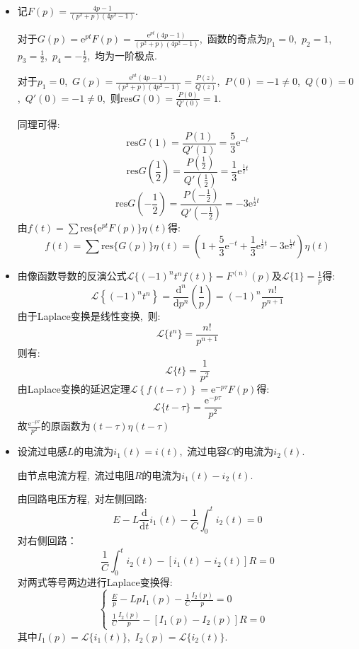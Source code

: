 \documentclass[a4paper,fontset=windows]{ctexart}
\begin{document}
\begin{itemize}
\smallskip
\item[4.(3)]
记$F(p)=\frac{4p-1}{(p^2+p)(4p^2-1)}$.

对于$G(p)=\mathrm{e}^{pt}F(p)=\frac{\mathrm{e}^{pt}(4p-1)}{(p^2+p)(4p^2-1)}$,\ 函数的奇点为$p_1=0$,\ $p_2=1$,\ $p_3=\frac{1}{2}$,\ $p_4=-\frac{1}{2}$,\ 均为一阶极点.

对于$p_1=0$,\ $G(p)=\frac{\mathrm{e}^{pt}(4p-1)}{(p^2+p)(4p^2-1)}=\frac{P(z)}{Q(z)}$,\ $P(0)=-1\neq0$,\ $Q(0)=0$,\ $Q'(0)=-1\neq0$,\ 则$\mathrm{res}G(0)=\frac{P(0)}{Q'(0)}=1$.

同理可得:
\[
\mathrm{res}G(1)
=\frac{P(1)}{Q'(1)}
=\frac{5}{3}\mathrm{e}^{-t}
\]
\[
\mathrm{res}G(\frac{1}{2})
=\frac{P(\frac{1}{2})}{Q'(\frac{1}{2})}
=\frac{1}{3}\mathrm{e}^{\frac{1}{2}t}
\]
\[
\mathrm{res}G(-\frac{1}{2})
=\frac{P(-\frac{1}{2})}{Q'(-\frac{1}{2})}
=-3\mathrm{e}^{\frac{1}{2}t}
\]
由$f(t)=\sum\mathrm{res}\{\mathrm{e}^{pt}F(p)\}\eta(t)$得:
\[
f(t)
=\sum\mathrm{res}\{G(p)\}\eta(t)
=\left(1+\frac{5}{3}\mathrm{e}^{-t}+\frac{1}{3}\mathrm{e}^{\frac{1}{2}t}-3\mathrm{e}^{\frac{1}{2}t}\right)\eta(t)
\]

\smallskip
\item[4.(5)]
由像函数导数的反演公式$\mathscr{L}\{(-1)^nt^nf(t)\}=F^{(n)}(p)$及$\mathscr{L}\{1\}=\frac{1}{p}$得:
\[
\mathscr{L}\left\lbrace(-1)^nt^n\right\rbrace
=\frac{\mathrm{d}^n}{\mathrm{d}p^n}(\frac{1}{p})
=(-1)^n\frac{n!}{p^{n+1}}
\]
由于Laplace变换是线性变换,\ 则:
\[
\mathscr{L}\{t^n\}
=\frac{n!}{p^{n+1}}
\]
则有:
\[
\mathscr{L}\{t\}
=\frac{1}{p^2}
\]
由Laplace变换的延迟定理$\mathscr{L}\left\lbrace f(t-\tau)\right\rbrace =\mathrm{e}^{-p\tau}F(p)$得:
\[
\mathscr{L}\{t-\tau\}
=\frac{\mathrm{e}^{-p\tau}}{p^2}
\]
故$\frac{\mathrm{e}^{-p\tau}}{p^2}$的原函数为$(t-\tau)\eta(t-\tau)$

\smallskip
\item[5.(2)]
设流过电感$L$的电流为$i_1(t)=i(t)$,\ 流过电容$C$的电流为$i_2(t)$.

由节点电流方程,\ 流过电阻$R$的电流为$i_1(t)-i_2(t)$.

由回路电压方程,\ 对左侧回路:
\[
E-L\frac{\mathrm{d}}{\mathrm{d}t}i_1(t)-\frac{1}{C}\int_{0}^{t}i_2(t)
=0
\]
对右侧回路：
\[
\frac{1}{C}\int_{0}^{t}i_2(t)-\left[i_1(t)-i_2(t)\right]R
=0
\]
对两式等号两边进行Laplace变换得:
\begin{equation}
\left\{
\begin{array}{lr}
\frac{E}{p}-LpI_1(p)-\frac{1}{C}\frac{I_2(p)}{p}=0 & \\
\frac{1}{C}\frac{I_2(p)}{p}-\left[I_1(p)-I_2(p)\right]R=0 & 
\end{array}
\right.
\end{equation}
其中$I_1(p)=\mathscr{L}\{i_1(t)\}$,\ $I_2(p)=\mathscr{L}\{i_2(t)\}$.


\end{itemize}
\end{document}
